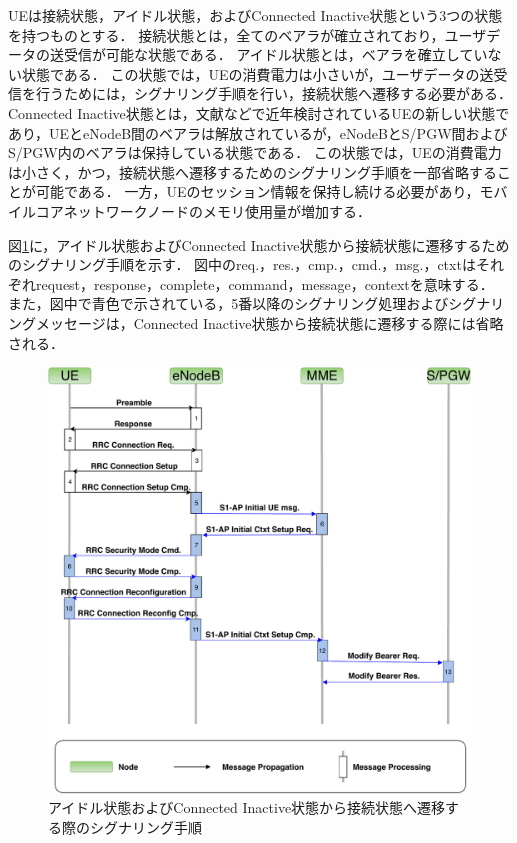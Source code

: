 \documentclass[technicalreport]{ieicej-rev}
\begin{document}
  UEは接続状態，アイドル状態，およびConnected Inactive状態という3つの状態を持つものとする．
  接続状態とは，全てのベアラが確立されており，ユーザデータの送受信が可能な状態である．
  アイドル状態とは，ベアラを確立していない状態である．
  この状態では，UEの消費電力は小さいが，ユーザデータの送受信を行うためには，シグナリング手順を行い，接続状態へ遷移する必要がある．
  Connected Inactive状態とは，文献\cite{RRCStateHandlingfor5G,ANovelStateModelfor5GRadioAccessNetworks}などで近年検討されているUEの新しい状態であり，UEとeNodeB間のベアラは解放されているが，eNodeBとS/PGW間およびS/PGW内のベアラは保持している状態である．
  この状態では，UEの消費電力は小さく，かつ，接続状態へ遷移するためのシグナリング手順を一部省略することが可能である．
  一方，UEのセッション情報を保持し続ける必要があり，モバイルコアネットワークノードのメモリ使用量が増加する．


  図\ref{Idle_Connect_Signaling}に，アイドル状態およびConnected Inactive状態から接続状態に遷移するためのシグナリング手順を示す．
  図中のreq.，res.，cmp.，cmd.，msg.，ctxtはそれぞれrequest，response，complete，command，message，contextを意味する．
  また，図中で青色で示されている，5番以降のシグナリング処理およびシグナリングメッセージは，Connected Inactive状態から接続状態に遷移する際には省略される．
  \begin{figure}[!t]
    \centering
    \includegraphics[width=1\hsize]{Idle_Connect_Signaling.pdf}
    \caption{アイドル状態およびConnected Inactive状態から接続状態へ遷移する際のシグナリング手順\cite{3gpp.23.720,ANovelStateModelfor5GRadioAccessNetworks}}
    \label{Idle_Connect_Signaling}
  \end{figure}
\end{document}
